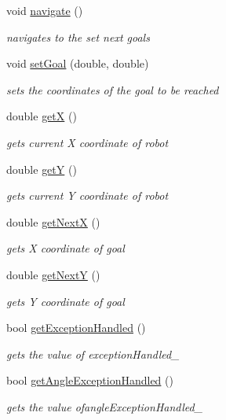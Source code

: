 \begin{DoxyCompactItemize}
void \mbox{\hyperlink{class_path_planning_module_a31e1be6e29e2acd14e492c6c60104f56}{navigate}} ()
\begin{DoxyCompactList}\small\item\em navigates to the set next goals \end{DoxyCompactList}\item 
void \mbox{\hyperlink{class_path_planning_module_a53bc600d54e6196a36e616fabb1e2c93}{set\+Goal}} (double, double)
\begin{DoxyCompactList}\small\item\em sets the coordinates of the goal to be reached \end{DoxyCompactList}\item 
double \mbox{\hyperlink{class_path_planning_module_ad53f67a8e9e760a394b78e9a5ae53b21}{getX}} ()
\begin{DoxyCompactList}\small\item\em gets current X coordinate of robot \end{DoxyCompactList}\item 
double \mbox{\hyperlink{class_path_planning_module_a327b34fd37c2d1b52c79eb48c8a84faf}{getY}} ()
\begin{DoxyCompactList}\small\item\em gets current Y coordinate of robot \end{DoxyCompactList}\item 
double \mbox{\hyperlink{class_path_planning_module_a94fa12fa16c7321a21a4e3209b9163af}{get\+NextX}} ()
\begin{DoxyCompactList}\small\item\em gets X coordinate of goal \end{DoxyCompactList}\item 
double \mbox{\hyperlink{class_path_planning_module_a8b540e4b6c5031bdedf75194c97a1ba7}{get\+NextY}} ()
\begin{DoxyCompactList}\small\item\em gets Y coordinate of goal \end{DoxyCompactList}\item 
bool \mbox{\hyperlink{class_path_planning_module_a88726f5b5c4919595c0027b8ea4776c3}{get\+Exception\+Handled}} ()
\begin{DoxyCompactList}\small\item\em gets the value of exception\+Handled\+\_\+ \end{DoxyCompactList}\item 
bool \mbox{\hyperlink{class_path_planning_module_a0772b25a199dd9bbec6452606fdd8722}{get\+Angle\+Exception\+Handled}} ()
\begin{DoxyCompactList}\small\item\em gets the value ofangle\+Exception\+Handled\+\_\+ \end{DoxyCompactList}\end{DoxyCompactItemize}


